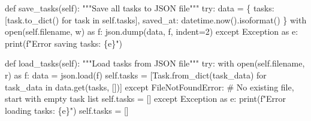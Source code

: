 \documentclass[
  letterpaper,
  DIV=11,
  numbers=noendperiod,
  oneside]{scrreprt}
\newenvironment{Shaded}{}{}
\newcommand{\BuiltInTok}[1]{\textcolor[rgb]{0.84,0.23,0.29}{#1}}
\newcommand{\CommentTok}[1]{\textcolor[rgb]{0.42,0.45,0.49}{#1}}
\newcommand{\ControlFlowTok}[1]{\textcolor[rgb]{0.84,0.23,0.29}{#1}}
\newcommand{\DecValTok}[1]{\textcolor[rgb]{0.00,0.36,0.77}{#1}}
\newcommand{\ImportTok}[1]{\textcolor[rgb]{0.01,0.18,0.38}{#1}}
\newcommand{\KeywordTok}[1]{\textcolor[rgb]{0.84,0.23,0.29}{#1}}
\newcommand{\NormalTok}[1]{\textcolor[rgb]{0.14,0.16,0.18}{#1}}
\newcommand{\OperatorTok}[1]{\textcolor[rgb]{0.14,0.16,0.18}{#1}}
\newcommand{\PreprocessorTok}[1]{\textcolor[rgb]{0.84,0.23,0.29}{#1}}
\newcommand{\SpecialCharTok}[1]{\textcolor[rgb]{0.00,0.36,0.77}{#1}}
\newcommand{\SpecialStringTok}[1]{\textcolor[rgb]{0.01,0.18,0.38}{#1}}
\newcommand{\StringTok}[1]{\textcolor[rgb]{0.01,0.18,0.38}{#1}}
\newcommand{\VariableTok}[1]{\textcolor[rgb]{0.89,0.38,0.04}{#1}}
\begin{document}
\begin{Shaded}
\begin{Highlighting}[]
    \KeywordTok{def}\NormalTok{ save\_tasks(}\VariableTok{self}\NormalTok{):}
        \CommentTok{"""Save all tasks to JSON file"""}
        \ControlFlowTok{try}\NormalTok{:}
\NormalTok{            data }\OperatorTok{=}\NormalTok{ \{}
                \StringTok{\textquotesingle{}tasks\textquotesingle{}}\NormalTok{: [task.to\_dict() }\ControlFlowTok{for}\NormalTok{ task }\KeywordTok{in} \VariableTok{self}\NormalTok{.tasks],}
                \StringTok{\textquotesingle{}saved\_at\textquotesingle{}}\NormalTok{: datetime.now().isoformat()}
\NormalTok{            \}}
            \ControlFlowTok{with} \BuiltInTok{open}\NormalTok{(}\VariableTok{self}\NormalTok{.filename, }\StringTok{\textquotesingle{}w\textquotesingle{}}\NormalTok{) }\ImportTok{as}\NormalTok{ f:}
\NormalTok{                json.dump(data, f, indent}\OperatorTok{=}\DecValTok{2}\NormalTok{)}
        \ControlFlowTok{except} \PreprocessorTok{Exception} \ImportTok{as}\NormalTok{ e:}
            \BuiltInTok{print}\NormalTok{(}\SpecialStringTok{f"Error saving tasks: }\SpecialCharTok{\{}\NormalTok{e}\SpecialCharTok{\}}\SpecialStringTok{"}\NormalTok{)}
    
    \KeywordTok{def}\NormalTok{ load\_tasks(}\VariableTok{self}\NormalTok{):}
        \CommentTok{"""Load tasks from JSON file"""}
        \ControlFlowTok{try}\NormalTok{:}
            \ControlFlowTok{with} \BuiltInTok{open}\NormalTok{(}\VariableTok{self}\NormalTok{.filename, }\StringTok{\textquotesingle{}r\textquotesingle{}}\NormalTok{) }\ImportTok{as}\NormalTok{ f:}
\NormalTok{                data }\OperatorTok{=}\NormalTok{ json.load(f)}
                \VariableTok{self}\NormalTok{.tasks }\OperatorTok{=}\NormalTok{ [Task.from\_dict(task\_data) }
                             \ControlFlowTok{for}\NormalTok{ task\_data }\KeywordTok{in}\NormalTok{ data.get(}\StringTok{\textquotesingle{}tasks\textquotesingle{}}\NormalTok{, [])]}
        \ControlFlowTok{except} \PreprocessorTok{FileNotFoundError}\NormalTok{:}
            \CommentTok{\# No existing file, start with empty task list}
            \VariableTok{self}\NormalTok{.tasks }\OperatorTok{=}\NormalTok{ []}
        \ControlFlowTok{except} \PreprocessorTok{Exception} \ImportTok{as}\NormalTok{ e:}
            \BuiltInTok{print}\NormalTok{(}\SpecialStringTok{f"Error loading tasks: }\SpecialCharTok{\{}\NormalTok{e}\SpecialCharTok{\}}\SpecialStringTok{"}\NormalTok{)}
            \VariableTok{self}\NormalTok{.tasks }\OperatorTok{=}\NormalTok{ []}
\end{Highlighting}
\end{Shaded}
\end{document}
